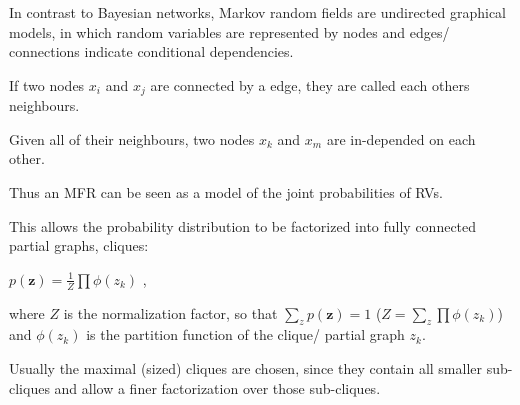 In contrast to Bayesian networks, Markov random fields are undirected graphical models, in which random variables are represented by nodes and edges/ connections indicate conditional dependencies.

If two nodes $x_i$ and $x_j$ are connected by a edge, they are called each others neighbours.

Given all of their neighbours, two nodes $x_k$ and $x_m$ are in-depended on each other.

Thus an MFR can be seen as a model of the joint probabilities of RVs.

This allows the probability distribution to be factorized into fully connected partial graphs, cliques:

$p(\textbf{z}) = \frac{1}{Z} \prod \phi (z_k) $ ,

where $Z$ is the normalization factor, so that $\sum_z p(\textbf{z}) = 1$ ($Z = \sum_z \prod \phi (z_k) $) and $\phi (z_k)$ is the partition function of the clique/ partial graph $z_k$.


Usually the maximal (sized) cliques are chosen, since they contain all smaller sub-cliques and allow a finer factorization over those sub-cliques.

